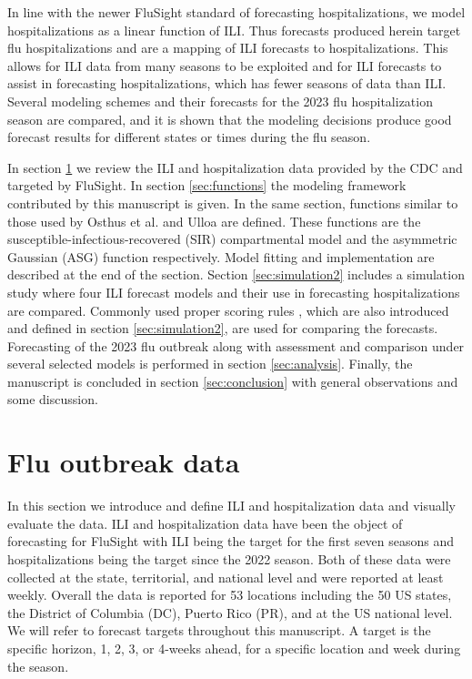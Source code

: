 In line with the newer FluSight standard of forecasting hospitalizations, we 
model hospitalizations as a linear function of ILI. Thus forecasts produced 
herein target flu hospitalizations and are a mapping of ILI forecasts to 
hospitalizations. This allows for ILI data from many seasons to be exploited 
and for ILI forecasts to assist in forecasting hospitalizations, which has 
fewer seasons of data than ILI. Several modeling schemes and their forecasts 
for the 2023 flu hospitalization season are compared, and it is shown that the 
modeling decisions produce good forecast results for different states or times 
during the flu season.

In section \ref{sec:data} we review the ILI and hospitalization data provided 
by the CDC and targeted by FluSight. 
In section \ref{sec:functions} the modeling framework contributed by this 
manuscript is given. In the same section, functions similar to those used by 
Osthus et al. \cite[]{osthus2019dynamic} and Ulloa \cite[]{ulloa2019} are 
defined.
 These functions are the susceptible-infectious-recovered (SIR) compartmental 
 model and the asymmetric Gaussian (ASG) function  respectively. Model fitting 
 and implementation are described at the end of the section. Section 
 \ref{sec:simulation2} includes a simulation study where four ILI forecast 
 models and their use in forecasting hospitalizations are compared. Commonly 
 used proper scoring rules \cite[]{gneiting2007strictly}, which are also 
 introduced and defined in section \ref{sec:simulation2}, are used for 
 comparing the forecasts. Forecasting of the 2023 flu outbreak along with 
 assessment and comparison under several selected models is performed in 
 section \ref{sec:analysis}. 
 Finally, the manuscript is concluded in section \ref{sec:conclusion} with 
 general observations and some discussion.
 
 
 
 
 
 
 
 
 
 
 
 
 \section{Flu outbreak data} \label{sec:data}
In this section we introduce and define ILI and hospitalization data and 
visually evaluate the data. ILI and hospitalization data have been the object 
of forecasting for FluSight with ILI being the target for the first seven 
seasons and hospitalizations being the target since the 2022 season. Both of 
these data were collected at the state, territorial, and national level and 
were reported at least weekly. Overall the data is reported for 53 locations 
including the 50 US states, the District of Columbia (DC), Puerto Rico (PR), 
and at the US national level. We will refer to forecast targets throughout this 
manuscript. A target is the specific horizon, 1, 2, 3, or 4-weeks ahead, for a 
specific location and week during the season.  

